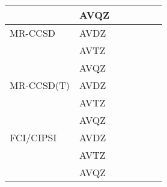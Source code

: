 \documentclass[aip,jcp,reprint,showkeys]{revtex4-1}
\begin{document}
\begin{table*}
\begin{ruledtabular}
\begin{tabular}{llccccc}
					&	AVQZ		&			&			&			&			&			\\
					\hline
		MR-CCSD		&	AVDZ		&			&			&			&			&			\\
					&	AVTZ		&			&			&			&			&			\\
					&	AVQZ		&			&			&			&			&			\\
					\hline
		MR-CCSD(T)	&	AVDZ		&			&			&			&			&			\\
					&	AVTZ		&			&			&			&			&			\\
					&	AVQZ		&			&			&			&			&			\\
					\hline
		FCI/CIPSI	&	AVDZ		&			&			&			&			&			\\
					&	AVTZ		&			&			&			&			&			\\
					&	AVQZ		&			&			&			&			&			\\
	\end{tabular}		
	\end{ruledtabular}		
\end{table*}		
\end{document}
